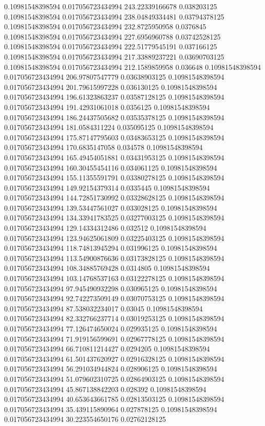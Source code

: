 0.10981548398594 0.017056723434994 243.22339166678 0.038203125
0.10981548398594 0.017056723434994 238.04849334481 0.03794378125
0.10981548398594 0.017056723434994 232.8725950958 0.0376845
0.10981548398594 0.017056723434994 227.6956960788 0.03742528125
0.10981548398594 0.017056723434994 222.51779545191 0.037166125
0.10981548398594 0.017056723434994 217.33889237221 0.03690703125
0.10981548398594 0.017056723434994 212.1589859958 0.036648
0.10981548398594 0.017056723434994 206.97807547779 0.03638903125
0.10981548398594 0.017056723434994 201.79615997228 0.036130125
0.10981548398594 0.017056723434994 196.61323863237 0.03587128125
0.10981548398594 0.017056723434994 191.42931061018 0.0356125
0.10981548398594 0.017056723434994 186.24437505682 0.03535378125
0.10981548398594 0.017056723434994 181.0584311224 0.035095125
0.10981548398594 0.017056723434994 175.87147795603 0.03483653125
0.10981548398594 0.017056723434994 170.6835147058 0.034578
0.10981548398594 0.017056723434994 165.49454051881 0.03431953125
0.10981548398594 0.017056723434994 160.30455454116 0.034061125
0.10981548398594 0.017056723434994 155.11355591791 0.03380278125
0.10981548398594 0.017056723434994 149.92154379314 0.0335445
0.10981548398594 0.017056723434994 144.72851730992 0.03328628125
0.10981548398594 0.017056723434994 139.53447561027 0.033028125
0.10981548398594 0.017056723434994 134.33941783525 0.03277003125
0.10981548398594 0.017056723434994 129.14334312486 0.032512
0.10981548398594 0.017056723434994 123.94625061809 0.03225403125
0.10981548398594 0.017056723434994 118.74813945294 0.031996125
0.10981548398594 0.017056723434994 113.54900876636 0.03173828125
0.10981548398594 0.017056723434994 108.34885769428 0.0314805
0.10981548398594 0.017056723434994 103.14768537163 0.03122278125
0.10981548398594 0.017056723434994 97.945490932298 0.030965125
0.10981548398594 0.017056723434994 92.742273509149 0.03070753125
0.10981548398594 0.017056723434994 87.538032234017 0.03045
0.10981548398594 0.017056723434994 82.332766237714 0.03019253125
0.10981548398594 0.017056723434994 77.126474650024 0.029935125
0.10981548398594 0.017056723434994 71.919156599691 0.02967778125
0.10981548398594 0.017056723434994 66.710811214427 0.0294205
0.10981548398594 0.017056723434994 61.501437620927 0.02916328125
0.10981548398594 0.017056723434994 56.291034944824 0.028906125
0.10981548398594 0.017056723434994 51.079602310725 0.02864903125
0.10981548398594 0.017056723434994 45.867138842203 0.028392
0.10981548398594 0.017056723434994 40.653643661785 0.02813503125
0.10981548398594 0.017056723434994 35.439115890964 0.027878125
0.10981548398594 0.017056723434994 30.223554650176 0.02762128125
